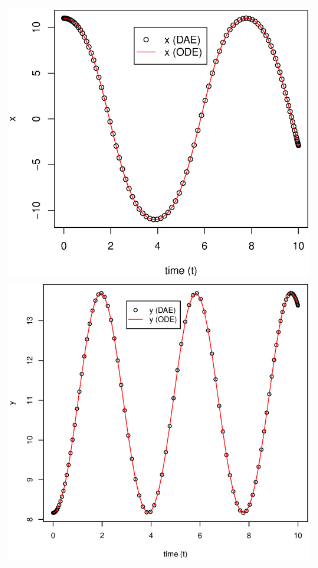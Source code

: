 \documentclass[11pt]{amsdtx}
\begin{document}
	\begin{center}
		\includegraphics[width = 0.6\textwidth]{x.eps}
		\includegraphics[width = 0.6\textwidth]{y.eps}
	\end{center}
\end{document}
